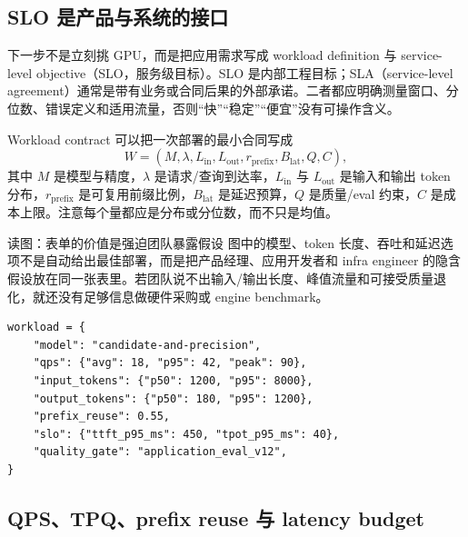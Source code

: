 \subsection{SLO 是产品与系统的接口}

下一步不是立刻挑 GPU，而是把应用需求写成 workload definition 与 service-level objective（SLO，服务级目标）。SLO 是内部工程目标；SLA（service-level agreement）通常是带有业务或合同后果的外部承诺。二者都应明确测量窗口、分位数、错误定义和适用流量，否则“快”“稳定”“便宜”没有可操作含义。


\begin{importantbox}{Workload contract}
可以把一次部署的最小合同写成
\[
W=(M,\lambda,L_{\mathrm{in}},L_{\mathrm{out}},r_{\mathrm{prefix}},B_{\mathrm{lat}},Q,C),
\]
其中 $M$ 是模型与精度，$\lambda$ 是请求/查询到达率，$L_{\mathrm{in}}$ 与 $L_{\mathrm{out}}$ 是输入和输出 token 分布，$r_{\mathrm{prefix}}$ 是可复用前缀比例，$B_{\mathrm{lat}}$ 是延迟预算，$Q$ 是质量/eval 约束，$C$ 是成本上限。注意每个量都应是分布或分位数，而不只是均值。
\end{importantbox}


\begin{knowledgebox}{读图：表单的价值是强迫团队暴露假设}
图中的模型、token 长度、吞吐和延迟选项不是自动给出最佳部署，而是把产品经理、应用开发者和 infra engineer 的隐含假设放在同一张表里。若团队说不出输入/输出长度、峰值流量和可接受质量退化，就还没有足够信息做硬件采购或 engine benchmark。
\end{knowledgebox}

\begin{lstlisting}[caption={工作负载定义的最小机器可读结构}]
workload = {
    "model": "candidate-and-precision",
    "qps": {"avg": 18, "p95": 42, "peak": 90},
    "input_tokens": {"p50": 1200, "p95": 8000},
    "output_tokens": {"p50": 180, "p95": 1200},
    "prefix_reuse": 0.55,
    "slo": {"ttft_p95_ms": 450, "tpot_p95_ms": 40},
    "quality_gate": "application_eval_v12",
}
\end{lstlisting}

\subsection{QPS、TPQ、prefix reuse 与 latency budget}

